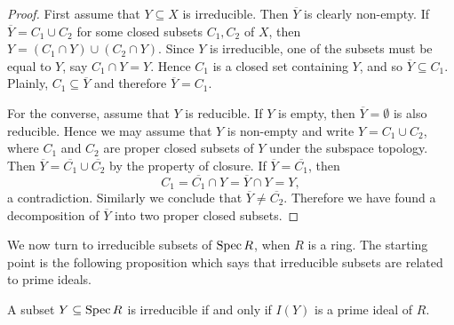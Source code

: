\begin{proof}
	First assume that $Y \subseteq X$ is irreducible. Then $\overline{Y}$ is clearly non-empty. If $\overline{Y} = C_1 \cup C_2$ for some closed subsets $C_1, C_2$ of $X$, then $Y = (C_1 \cap Y) \cup (C_2 \cap Y)$. Since $Y$ is irreducible, one of the subsets must be equal to $Y$, say $C_1 \cap Y = Y$. Hence $C_1$ is a closed set containing $Y$, and so $\overline{Y} \subseteq C_1$. Plainly, $C_1 \subseteq \overline{Y}$ and therefore $\overline{Y} = C_1$.
	
	For the converse, assume that $Y$ is reducible. If $Y$ is empty, then $\overline{Y} = \emptyset$ is also reducible. Hence we may assume that $Y$ is non-empty and write $Y = C_1 \cup C_2$, where $C_1$ and $C_2$ are proper closed subsets of $Y$ under the subspace topology. Then $\overline{Y} = \overline{C_1} \cup \overline{C_2}$ by the property of closure. If $\overline{Y} = \overline{C_1}$, then 
	\begin{equation*}
		C_1 = \overline{C_1} \cap Y = \overline{Y} \cap Y = Y,
	\end{equation*} 
	a contradiction. Similarly we conclude that $\overline{Y} \neq \overline{C_2}$. Therefore we have found a decomposition of $\overline{Y}$ into two proper closed subsets.
\end{proof}

We now turn to irreducible subsets of $\operatorname{Spec} R$, when $R$ is a ring. The starting point is the following proposition which says that irreducible subsets are related to prime ideals.

\begin{proposition}\label{chap2:irreducible-iff-prime}
	A subset $Y \subseteq \operatorname{Spec} R$ is irreducible if and only if $I(Y)$ is a prime ideal of $R$.
\end{proposition}


